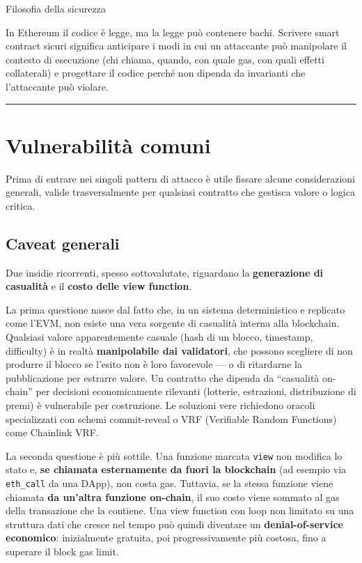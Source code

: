 \documentclass[
  italian,
  openany]{book}
\begin{document}
\begin{callouttip}{Filosofia della sicurezza}

In Ethereum il codice è legge, ma la legge può contenere bachi. Scrivere
smart contract sicuri significa anticipare i modi in cui un attaccante
può manipolare il contesto di esecuzione (chi chiama, quando, con quale
gas, con quali effetti collaterali) e progettare il codice perché non
dipenda da invarianti che l'attaccante può violare.

\end{callouttip}

\begin{center}\rule{0.5\linewidth}{0.5pt}\end{center}

\section{Vulnerabilità comuni}\label{vulnerabilituxe0-comuni}

Prima di entrare nei singoli pattern di attacco è utile fissare alcune
considerazioni generali, valide trasversalmente per qualsiasi contratto
che gestisca valore o logica critica.

\subsection{Caveat generali}\label{caveat-generali}

Due insidie ricorrenti, spesso sottovalutate, riguardano la
\textbf{generazione di casualità} e il \textbf{costo delle view
function}.

La prima questione nasce dal fatto che, in un sistema deterministico e
replicato come l'EVM, non esiste una vera sorgente di casualità interna
alla blockchain. Qualsiasi valore apparentemente casuale (hash di un
blocco, timestamp, difficulty) è in realtà \textbf{manipolabile dai
validatori}, che possono scegliere di non produrre il blocco se l'esito
non è loro favorevole --- o di ritardarne la pubblicazione per estrarre
valore. Un contratto che dipenda da ``casualità on-chain'' per decisioni
economicamente rilevanti (lotterie, estrazioni, distribuzione di premi)
è vulnerabile per costruzione. Le soluzioni vere richiedono oracoli
specializzati con schemi commit-reveal o VRF (Verifiable Random
Functions) come Chainlink VRF.

La seconda questione è più sottile. Una funzione marcata \texttt{view}
non modifica lo stato e, \textbf{se chiamata esternamente da fuori la
blockchain} (ad esempio via \texttt{eth\_call} da una DApp), non costa
gas. Tuttavia, se la stessa funzione viene chiamata \textbf{da un'altra
funzione on-chain}, il suo costo viene sommato al gas della transazione
che la contiene. Una view function con loop non limitato su una
struttura dati che cresce nel tempo può quindi diventare un
\textbf{denial-of-service economico}: inizialmente gratuita, poi
progressivamente più costosa, fino a superare il block gas limit.
\end{document}
